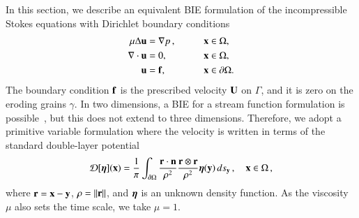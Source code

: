 \documentclass[preprint, 10pt]{elsarticle}
\begin{document}
In this section, we describe an equivalent BIE formulation of the incompressible Stokes equations with Dirichlet boundary conditions
\begin{equation}
  \begin{split}
  \mu\Delta {\mathbf{u}} &= {\nabla} p\, , \qquad && {\mathbf{x}} \in \Omega, \\
  {\nabla} \cdot {\mathbf{u}} &= 0,   && {\mathbf{x}} \in \Omega, \\
  {\mathbf{u}} &= {\mathbf{f}},  && {\mathbf{x}} \in {\partial}\Omega.
  \end{split}
  \label{eqn:stokes}
\end{equation}
The boundary condition ${\mathbf{f}}$ is the prescribed velocity ${\mathbf{U}}$ on $\Gamma$, and it is zero on the eroding grains $\gamma$.  In two dimensions, a BIE for a stream function formulation is possible~\cite{gre-kro-may1996}, but this does not extend to three dimensions.  Therefore, we adopt a primitive variable formulation where the velocity is written in terms of the standard double-layer potential~\cite{lad1963,poz1992}
\begin{align}
  {\mathcal{D}}[{\boldsymbol\eta}]({\mathbf{x}}) = \frac{1}{\pi} \int_{{\partial}\Omega} 
    \frac{{\mathbf{r}} \cdot {\mathbf{n}}}{\rho^2} \frac{{\mathbf{r}} \otimes {\mathbf{r}}}{\rho^2} 
    {\boldsymbol\eta}({\mathbf{y}}) \, ds_{\mathbf{y}}\, , \quad {\mathbf{x}} \in \Omega \, ,
    \label{eqn:velocityDLP}
\end{align}
where ${\mathbf{r}} = {\mathbf{x}} - {\mathbf{y}}$, $\rho = \|{\mathbf{r}}\|$, and ${\boldsymbol\eta}$ is an unknown density function.  As the viscosity $\mu$ also sets the time scale, we take $\mu=1$.
\end{document}
